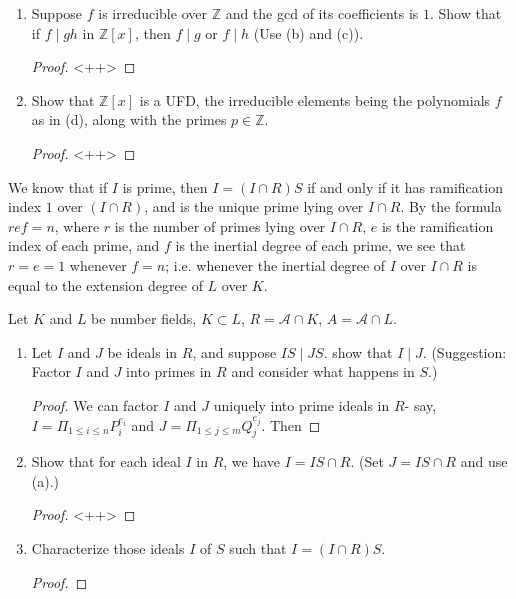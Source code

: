 \documentclass[12pt]{article}
\newcommand{\Z}{\mathbb{Z}}
\theoremstyle{definition}
\newenvironment{problem}[2][Problem]{\begin{trivlist}
\item[\hskip \labelsep {\bfseries #1}\hskip \labelsep {\bfseries #2.}]}{\end{trivlist}}
\begin{document}
\begin{problem}{8}
\begin{enumerate}[label=(\alph*)]
\begin{proof}
				<++>
			\end{proof}
		\item Suppose $f$ is irreducible over $\Z$ and the gcd of its coefficients is $1$. Show that if $f \mid gh$ in $\Z[x]$, then $f \mid g$ or $f \mid h$ (Use (b) and (c)).
			\begin{proof}
				<++>
			\end{proof}
		\item Show that $\Z[x]$ is a UFD, the irreducible elements being the polynomials $f$ as in (d), along with the primes $p \in \Z$.
			\begin{proof}
				<++>
			\end{proof}
	\end{enumerate}
				We know that if $I$ is prime, then $I = (I \cap R) S$ if and only if it has ramification index $1$ over $(I \cap R)$, and is the unique prime lying over $I \cap R$. By the formula $ref = n$, where $r$ is the number of primes lying over $I \cap R$, $e$ is the ramification index of each prime, and $f$ is the inertial degree of each prime, we see that $r = e = 1$ whenever $f = n$; i.e. whenever the inertial degree of $I$ over $I \cap R$ is equal to the extension degree of $L$ over $K$.
\end{problem}
\begin{problem}{9}
Let $K$ and $L$ be number fields, $K \subset L$, $R = \mathcal A \cap K$, $A = \mathcal A \cap L$.
\begin{enumerate}[label=(\alph*)]
		\item Let $I$ and $J$ be ideals in $R$, and suppose $IS \mid JS$. show that $I \mid J$. (Suggestion: Factor $I$ and $J$ into primes in $R$ and consider what happens in $S$.)
			\begin{proof}
				We can factor $I$ and $J$ uniquely into prime ideals in $R$- say, $I = \Pi_{1 \leq i \leq n} P_i^{e_i}$ and $J = \Pi_{1 \leq j \leq m}Q_{j}^{e_j}$.
Then  
			\end{proof}
		\item Show that for each ideal $I$ in $R$, we have $I = IS \cap R$. (Set $J = IS \cap R$ and use (a).)
			\begin{proof}
				<++>
			\end{proof}
		\item Characterize those ideals $I$ of $S$ such that $I = (I \cap R) S$. 
			\begin{proof}
			\end{proof}
	\end{enumerate}
\end{problem}
\begin{problem}{<++>}
<++>
\end{problem}<++>
\end{document}
